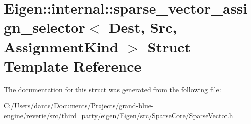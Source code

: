 \hypertarget{struct_eigen_1_1internal_1_1sparse__vector__assign__selector}{}\section{Eigen\+::internal\+::sparse\+\_\+vector\+\_\+assign\+\_\+selector$<$ Dest, Src, Assignment\+Kind $>$ Struct Template Reference}
\label{struct_eigen_1_1internal_1_1sparse__vector__assign__selector}


The documentation for this struct was generated from the following file\+:\begin{DoxyCompactItemize}
\item 
C\+:/\+Users/dante/\+Documents/\+Projects/grand-\/blue-\/engine/reverie/src/third\+\_\+party/eigen/\+Eigen/src/\+Sparse\+Core/Sparse\+Vector.\+h\end{DoxyCompactItemize}
